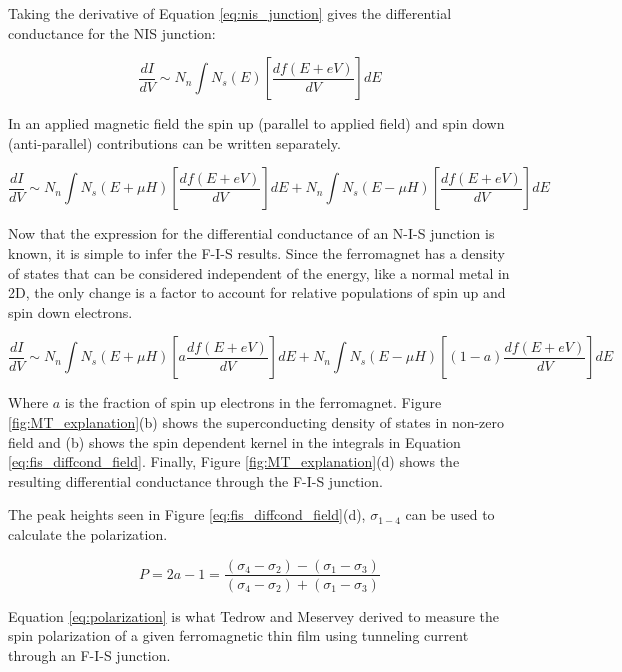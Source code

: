 Taking the derivative of Equation \ref{eq:nis_junction} gives the differential conductance for the NIS junction:

\begin{equation}
    \label{eq:nis_diffcond}
    \frac{dI}{dV} \sim N_n \int N_s(E)[\frac{df(E+eV)}{dV}]dE
\end{equation}

In an applied magnetic field the spin up (parallel to applied field) and spin down (anti-parallel) contributions can be written separately.

\begin{equation}
    \label{eq:nis_diffcond_field}
    \frac{dI}{dV} \sim N_n \int N_s(E+\mu H)[\frac{df(E+eV)}{dV}]dE + N_n \int N_s(E-\mu H)[\frac{df(E+eV)}{dV}]dE
\end{equation}

Now that the expression for the differential conductance of an N-I-S junction is known, it is simple to infer the F-I-S results. Since the ferromagnet has a density of states that can be considered independent of the energy, like a normal metal in 2D, the only change is a factor to account for relative populations of spin up and spin down electrons.

\begin{equation}
    \label{eq:fis_diffcond_field}
    \frac{dI}{dV} \sim N_n \int N_s(E+\mu H)[a\frac{df(E+eV)}{dV}]dE + N_n \int N_s(E-\mu H)[(1-a)\frac{df(E+eV)}{dV}]dE
\end{equation}

Where $a$ is the fraction of spin up electrons in the ferromagnet. Figure \ref{fig:MT_explanation}(b) shows the superconducting density of states in non-zero field and (b) shows the spin dependent kernel in the integrals in Equation \ref{eq:fis_diffcond_field}. Finally, Figure \ref{fig:MT_explanation}(d) shows the resulting differential conductance through the F-I-S junction. 

The peak heights seen in Figure \ref{eq:fis_diffcond_field}(d), $\sigma_{1-4}$ can be used to calculate the polarization.

\begin{equation}
    \label{eq:polarization}
    P = 2a-1 = \frac{(\sigma_4 - \sigma_2) - (\sigma_1 - \sigma_3)}{(\sigma_4 - \sigma_2) + (\sigma_1 - \sigma_3)}
\end{equation}

Equation \ref{eq:polarization} is what Tedrow and Meservey derived to measure the spin polarization of a given ferromagnetic thin film using tunneling current through an F-I-S junction.

